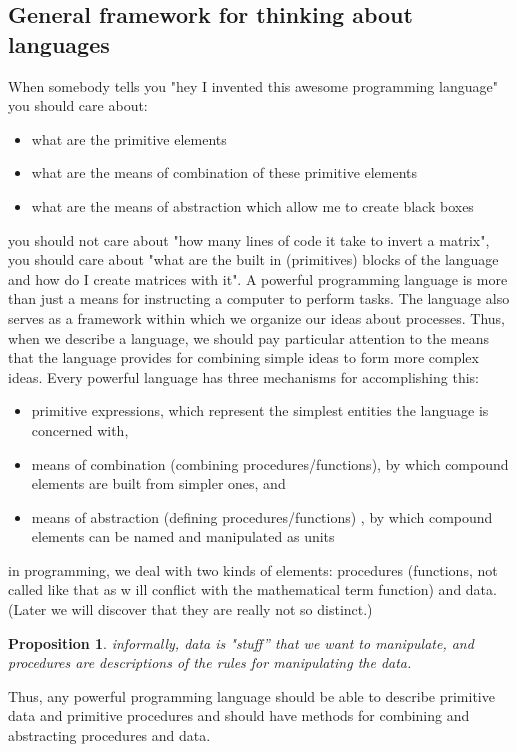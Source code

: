 \documentclass[a4paper,twoside]{article}
\newtheorem{proposition}[theorem]{Proposition}
\numberwithin{equation}{section}
\begin{document}
\subsection{General framework for thinking about languages}
When somebody tells you "hey I invented this awesome programming language" you should care about:
\begin{itemize}
    \item what are the primitive elements
    \item what are the means of combination of these primitive elements
    \item what are the means of abstraction which allow me to create black boxes
\end{itemize}
you should not care about "how many lines of code it take to invert a matrix", you should care about
"what are the built in (primitives) blocks of the language and how do I create matrices with it".
A powerful programming language is more than just a means for instructing a computer to perform tasks.
The language also serves as a framework within which we organize our ideas about processes. Thus,
when we describe a language, we should pay particular attention to the
means that the language provides for combining simple ideas to form more complex ideas. Every powerful
language has three mechanisms for accomplishing this:
\begin{itemize}
    \item primitive expressions, which represent the simplest entities the
          language is concerned with,
    \item means of combination (combining procedures/functions), by which compound elements are built
          from simpler ones, and
    \item means of abstraction (defining procedures/functions) , by which compound elements can be named
          and manipulated as units
\end{itemize}
in programming, we deal with two kinds of elements: procedures (functions, not called like that as w
ill conflict with the mathematical term function) and data. (Later we will discover that they are really not so distinct.)
\begin{proposition}
    informally, data is "stuff” that we want to manipulate, and procedures are
    descriptions of the rules for manipulating the data.
\end{proposition}
Thus, any powerful programming language should be able to describe primitive data and primitive
procedures and should have methods for combining and abstracting procedures and data.
\end{document}
